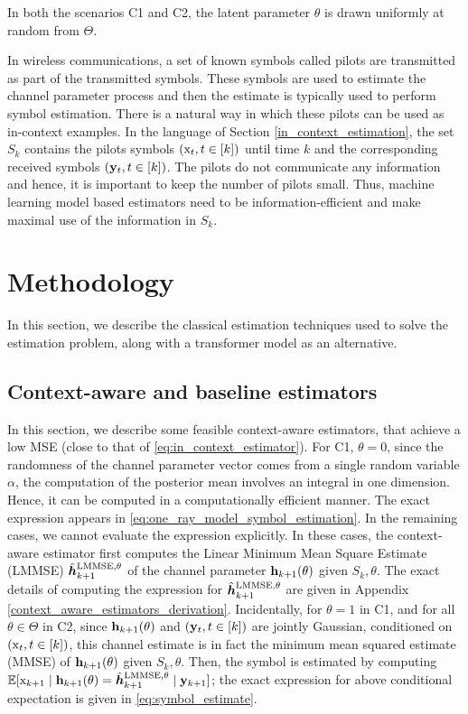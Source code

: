 \documentclass[journal,letterpaper,onecolumn]{IEEEtran}
\begin{document}
In both the scenarios C1 and C2, the latent parameter $\theta$ is drawn uniformly at random from $\Theta$. 


In wireless communications, a set of known symbols called pilots are transmitted as part of the transmitted symbols. 
These symbols are used to estimate the channel parameter process and then the estimate is typically used to perform symbol estimation. 
There is a natural way in which these pilots can be used as in-context examples. 
In the language of Section \ref{in_context_estimation}, the set $S_k$ contains the pilots symbols $({\textnormal{x}}_t, t\in[k])$ until time $k$
and the corresponding received symbols $({\mathbf{y}}_t, t\in[k])$. 
The pilots do not communicate any information and hence, it is important to keep the number of pilots small. 
Thus, machine learning model based estimators need to be information-efficient and make maximal use of the information in $S_k$.


\section{Methodology}

In this section, we describe the classical estimation techniques used to solve the estimation problem, along with a transformer model as an alternative.

\subsection{Context-aware and baseline estimators}
\label{baseline_genie_descriptions}
In this section, we describe some feasible context-aware estimators, that achieve a low MSE (close to that of \ref{eq:in_context_estimator}). For C1, $\theta = 0$, since the randomness of the channel parameter vector comes from a single random variable $\alpha$, the computation of the posterior mean involves an integral in one dimension. Hence, it can be computed in a computationally efficient manner. The exact expression appears in \ref{eq:one_ray_model_symbol_estimation}. 
In the remaining cases, we cannot evaluate the expression explicitly. In these cases, the context-aware estimator first computes the Linear Minimum Mean Square Estimate (LMMSE) $\hat{{\bm{h}}}_{k+1}^{\rm LMMSE, \theta}$  of the channel parameter ${{\mathbf{h}}}_{k+1}(\theta)$ given $S_k, \theta$. The exact details of computing the expression for $\hat{{\bm{h}}}_{k+1}^{\rm LMMSE, \theta}$ are given in Appendix \ref{context_aware_estimators_derivation}. Incidentally, for $\theta=1$ in C1, and for all $\theta \in \Theta$ in C2, since ${\mathbf{h}}_{k+1}(\theta)$ and $({\mathbf{y}}_t, t\in [k])$ are jointly Gaussian, conditioned on $({\textnormal{x}}_t, t\in[k])$, this channel estimate is in fact the minimum mean squared estimate (MMSE) of ${\mathbf{h}}_{k+1}(\theta)$ given $S_k, \theta$. Then, the symbol is estimated by computing $\mathbb{E}[{\textnormal{x}}_{k+1} \mid {\mathbf{h}}_{k+1}(\theta) = \hat{{\bm{h}}}_{k+1}^{\rm LMMSE, \theta} \mid {\mathbf{y}}_{k+1}]$; the exact expression for above conditional expectation is given in \ref{eq:symbol_estimate}.
\end{document}

